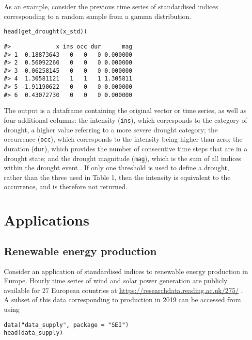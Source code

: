 As an example, consider the previous time series of standardised indices corresponding to a random sample from a gamma distribution.

\begin{verbatim}
head(get_drought(x_std))
\end{verbatim}

\begin{verbatim}
#>             x ins occ dur      mag
#> 1  0.18873643   0   0   0 0.000000
#> 2  0.56092260   0   0   0 0.000000
#> 3 -0.06258145   0   0   0 0.000000
#> 4  1.30581121   1   1   1 1.305811
#> 5 -1.91190622   0   0   0 0.000000
#> 6  0.43072730   0   0   0 0.000000
\end{verbatim}

The output is a dataframe containing the original vector or time series, as well as four additional columns: the intensity (\texttt{ins}), which corresponds to the category of drought, a higher value referring to a more severe drought category; the occurrence (\texttt{occ}), which corresponds to the intensity being higher than zero; the duration (\texttt{dur}), which provides the number of consecutive time steps that are in a drought state; and the drought magnitude (\texttt{mag}), which is the sum of all indices within the drought event \citep[see][for details]{MckeeEtAl1993}. If only one threshold is used to define a drought, rather than the three used in Table 1, then the intensity is equivalent to the occurrence, and is therefore not returned.

\hypertarget{applications}{%
\section{Applications}\label{applications}}

\hypertarget{renewable-energy-production}{%
\subsection{Renewable energy production}\label{renewable-energy-production}}

Consider an application of standardised indices to renewable energy production in Europe. Hourly time series of wind and solar power generation are publicly available for 27 European countries at \url{https://researchdata.reading.ac.uk/275/} \citep[see][for details]{BloomfieldEtAl2020}. A subset of this data corresponding to production in 2019 can be accessed from  using

\begin{verbatim}
data("data_supply", package = "SEI")
head(data_supply)
\end{verbatim}

